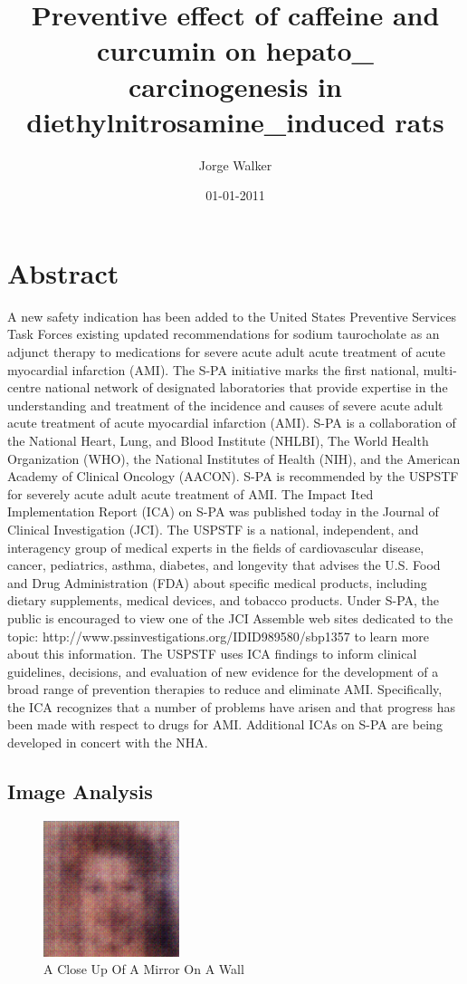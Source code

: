 \documentclass{article}%
\title{Preventive effect of caffeine and curcumin on hepato\_ carcinogenesis in diethylnitrosamine\_induced rats}%
\author{Jorge Walker}%
\affil{National Creative Research Initiatives Center for Nuclear Receptor Signals, Hormone Research Center, School of Biological Sciences and Technology, Chonnam National University, Gwangju, Republic of Korea}%
\date{01{-}01{-}2011}%
\begin{document}
%
\normalsize%
\maketitle%
\section{Abstract}%
\label{sec:Abstract}%
A new safety indication has been added to the United States Preventive Services Task Forces existing updated recommendations for sodium taurocholate as an adjunct therapy to medications for severe acute adult acute treatment of acute myocardial infarction (AMI). The S{-}PA initiative marks the first national, multi{-}centre national network of designated laboratories that provide expertise in the understanding and treatment of the incidence and causes of severe acute adult acute treatment of acute myocardial infarction (AMI). S{-}PA is a collaboration of the National Heart, Lung, and Blood Institute (NHLBI), The World Health Organization (WHO), the National Institutes of Health (NIH), and the American Academy of Clinical Oncology (AACON).\newline%
S{-}PA is recommended by the USPSTF for severely acute adult acute treatment of AMI. The Impact Ited Implementation Report (ICA) on S{-}PA was published today in the Journal of Clinical Investigation (JCI). The USPSTF is a national, independent, and interagency group of medical experts in the fields of cardiovascular disease, cancer, pediatrics, asthma, diabetes, and longevity that advises the U.S. Food and Drug Administration (FDA) about specific medical products, including dietary supplements, medical devices, and tobacco products. Under S{-}PA, the public is encouraged to view one of the JCI Assemble web sites dedicated to the topic: http://www.pssinvestigations.org/IDID989580/sbp1357 to learn more about this information.\newline%
The USPSTF uses ICA findings to inform clinical guidelines, decisions, and evaluation of new evidence for the development of a broad range of prevention therapies to reduce and eliminate AMI. Specifically, the ICA recognizes that a number of problems have arisen and that progress has been made with respect to drugs for AMI. Additional ICAs on S{-}PA are being developed in concert with the NHA.

%
\subsection{Image Analysis}%
\label{subsec:ImageAnalysis}%


\begin{figure}[h!]%
\centering%
\includegraphics[width=150px]{500_fake_images/samples_5_250.png}%
\caption{A Close Up Of A Mirror On A Wall}%
\end{figure}

%
\end{document}
